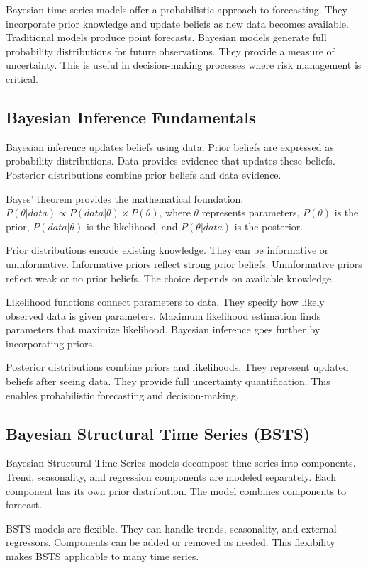 Bayesian time series models offer a probabilistic approach to forecasting. They incorporate prior knowledge and update beliefs as new data becomes available. Traditional models produce point forecasts. Bayesian models generate full probability distributions for future observations. They provide a measure of uncertainty. This is useful in decision-making processes where risk management is critical.

\subsection{Bayesian Inference Fundamentals}

Bayesian inference updates beliefs using data. Prior beliefs are expressed as probability distributions. Data provides evidence that updates these beliefs. Posterior distributions combine prior beliefs and data evidence.

Bayes' theorem provides the mathematical foundation. \(P(\theta|data) \propto P(data|\theta) \times P(\theta)\), where \(\theta\) represents parameters, \(P(\theta)\) is the prior, \(P(data|\theta)\) is the likelihood, and \(P(\theta|data)\) is the posterior.

Prior distributions encode existing knowledge. They can be informative or uninformative. Informative priors reflect strong prior beliefs. Uninformative priors reflect weak or no prior beliefs. The choice depends on available knowledge.

Likelihood functions connect parameters to data. They specify how likely observed data is given parameters. Maximum likelihood estimation finds parameters that maximize likelihood. Bayesian inference goes further by incorporating priors.

Posterior distributions combine priors and likelihoods. They represent updated beliefs after seeing data. They provide full uncertainty quantification. This enables probabilistic forecasting and decision-making.

\subsection{Bayesian Structural Time Series (BSTS)}

Bayesian Structural Time Series models decompose time series into components. Trend, seasonality, and regression components are modeled separately. Each component has its own prior distribution. The model combines components to forecast.

BSTS models are flexible. They can handle trends, seasonality, and external regressors. Components can be added or removed as needed. This flexibility makes BSTS applicable to many time series.


